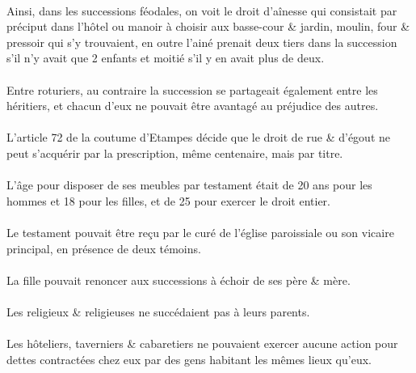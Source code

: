 \documentclass[../eBook.tex]{subfiles}
\begin{document}
      \paragraph{}Ainsi, dans les successions féodales, on voit le droit d'aînesse qui consistait par préciput dans l'hôtel ou manoir à choisir aux basse-cour \& jardin, moulin, four \& pressoir qui s'y trouvaient, en outre l'ainé prenait deux tiers dans la succession s'il n'y avait que 2 enfants et moitié s'il y en avait plus de deux.
      \paragraph{}Entre roturiers, au contraire la succession se partageait également entre les héritiers, et chacun d'eux ne pouvait être avantagé au préjudice des autres.
      \paragraph{}L'article 72 de la coutume d'Etampes décide que le droit de rue \& d'égout ne peut s'acquérir par la prescription, même centenaire, mais par titre.
      \paragraph{}L'âge pour disposer de ses meubles par testament était de 20 ans pour les hommes et 18 pour les filles, et de 25 pour exercer le droit entier.
      \paragraph{}Le testament pouvait être reçu par le curé de l'église paroissiale ou son vicaire principal, en présence de deux témoins.
      \paragraph{}La fille pouvait renoncer aux successions à échoir de ses père \& mère.
      \paragraph{}Les religieux \& religieuses ne succédaient pas à leurs parents.
      \paragraph{}Les hôteliers, taverniers \& cabaretiers ne pouvaient exercer aucune action pour dettes contractées chez eux par des gens habitant les mêmes lieux qu'eux.
\end{document}
